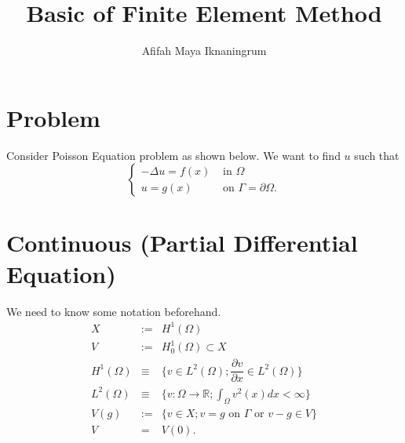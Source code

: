 \documentclass[]{report}
\title{Basic of Finite Element Method}
\author{Afifah Maya Iknaningrum}
\begin{document}

\section{Problem}
Consider Poisson Equation problem as shown below. We want to find $ u $ such that
\begin{equation}\label{Poisson}
\begin{cases}
-\Delta u = f(x) & \text{ in } \Omega \\
u = g(x) & \text{ on } \Gamma = \partial \Omega.
\end{cases}
\end{equation}

\section{Continuous (Partial Differential Equation)}
We need to know some notation beforehand.
\begin{eqnarray}\label{notation} \nonumber
X &:=& H^{1}(\Omega) \\ \nonumber
V &:=& H^{1}_{0}(\Omega) \subset X \\ \nonumber
H^{1}(\Omega) &\equiv& \{ v \in L^{2}(\Omega) ; \dfrac{\partial v}{\partial x} \in L^{2}(\Omega) \} \\ \nonumber
L^{2}(\Omega) &\equiv& \{ v: \Omega \rightarrow \mathbb{R} ;  \int_{\Omega} v^{2}(x) dx < \infty \} \\ \nonumber
V(g) &:=& \{ v \in X ; v=g \text{ on } \Gamma \text{ or } v-g \in V \} \\ \nonumber
V &=& V(0).
\end{eqnarray}
\end{document}
